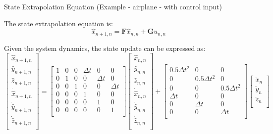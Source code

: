 \begin{frame}{State Extrapolation Equation (Example - airplane - with control input)}

The state extrapolation equation is:
$$\hat{x}_{n+1,n} = \mathbf{F}\hat{x}_{n,n} + \mathbf{G}u_{n,n}$$

Given the system dynamics, the state update can be expressed as:
\begin{equation}
\left[
\begin{array}{c}
\hat{x}_{n+1,n} \\
\hat{y}_{n+1,n} \\
\hat{z}_{n+1,n} \\
\dot{\hat{x}}_{n+1,n} \\
\dot{\hat{y}}_{n+1,n} \\
\dot{\hat{z}}_{n+1,n} \\
\end{array}
\right]
\!=\!
\left[
\begin{array}{cccccc}
1 & 0 & 0 & \Delta t & 0 & 0 \\
0 & 1 & 0 & 0 & \Delta t & 0 \\
0 & 0 & 1 & 0 & 0 & \Delta t \\
0 & 0 & 0 & 1 & 0 & 0 \\
0 & 0 & 0 & 0 & 1 & 0 \\
0 & 0 & 0 & 0 & 0 & 1 \\
\end{array}
\right]
\left[
\begin{array}{c}
\hat{x}_{n,n} \\
\hat{y}_{n,n} \\
\hat{z}_{n,n} \\
\dot{\hat{x}}_{n,n} \\
\dot{\hat{y}}_{n,n} \\
\dot{\hat{z}}_{n,n} \\
\end{array}
\right]
\!+\!
\left[
\begin{array}{ccc}
0.5\Delta t^2 & 0 & 0 \\
0 & 0.5\Delta t^2 & 0 \\
0 & 0 & 0.5\Delta t^2 \\
\Delta t & 0 & 0 \\
0 & \Delta t & 0 \\
0 & 0 & \Delta t \\
\end{array}
\right]
\left[
\begin{array}{c}
\ddot{x}_n \\
\ddot{y}_n \\
\ddot{z}_n \\
\end{array}
\right]\nonumber
\end{equation}

\end{frame}
